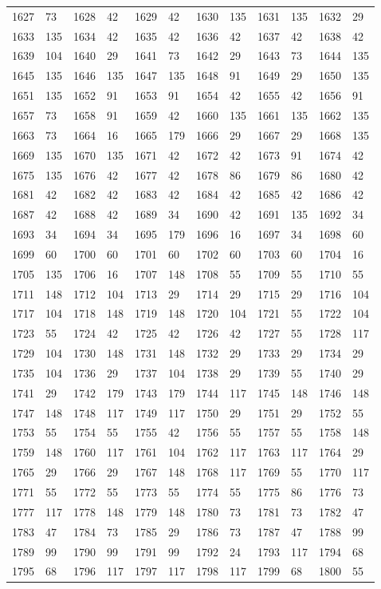 \begin{longtable}{llllllllllll}
1627 & 73&1628 &42&1629& 42&1630 &135&1631 &135&1632& 29\\
1633 & 135&1634 &42&1635& 42&1636 &42&1637 &42&1638& 42\\
1639 & 104&1640 &29&1641& 73&1642 &29&1643 &73&1644& 135\\
1645 & 135&1646 &135&1647& 135&1648 &91&1649 &29&1650& 135\\
1651 & 135&1652 &91&1653& 91&1654 &42&1655 &42&1656& 91\\
1657 & 73&1658 &91&1659& 42&1660 &135&1661 &135&1662& 135\\
1663 & 73&1664 &16&1665& 179&1666 &29&1667 &29&1668& 135\\
1669 & 135&1670 &135&1671& 42&1672 &42&1673 &91&1674& 42\\
1675 & 135&1676 &42&1677& 42&1678 &86&1679 &86&1680& 42\\
1681 & 42&1682 &42&1683& 42&1684 &42&1685 &42&1686& 42\\
1687 & 42&1688 &42&1689& 34&1690 &42&1691 &135&1692& 34\\
1693 & 34&1694 &34&1695& 179&1696 &16&1697 &34&1698& 60\\
1699 & 60&1700 &60&1701& 60&1702 &60&1703 &60&1704& 16\\
1705 & 135&1706 &16&1707& 148&1708 &55&1709 &55&1710& 55\\
1711 & 148&1712 &104&1713& 29&1714 &29&1715 &29&1716& 104\\
1717 & 104&1718 &148&1719& 148&1720 &104&1721 &55&1722& 104\\
1723 & 55&1724 &42&1725& 42&1726 &42&1727 &55&1728& 117\\
1729 & 104&1730 &148&1731& 148&1732 &29&1733 &29&1734& 29\\
1735 & 104&1736 &29&1737& 104&1738 &29&1739 &55&1740& 29\\
1741 & 29&1742 &179&1743& 179&1744 &117&1745 &148&1746& 148\\
1747 & 148&1748 &117&1749& 117&1750 &29&1751 &29&1752& 55\\
1753 & 55&1754 &55&1755& 42&1756 &55&1757 &55&1758& 148\\
1759 & 148&1760 &117&1761& 104&1762 &117&1763 &117&1764& 29\\
1765 & 29&1766 &29&1767& 148&1768 &117&1769 &55&1770& 117\\
1771 & 55&1772 &55&1773& 55&1774 &55&1775 &86&1776& 73\\
1777 & 117&1778 &148&1779& 148&1780 &73&1781 &73&1782& 47\\
1783 & 47&1784 &73&1785& 29&1786 &73&1787 &47&1788& 99\\
1789 & 99&1790 &99&1791& 99&1792 &24&1793 &117&1794& 68\\
1795 & 68&1796 &117&1797& 117&1798 &117&1799 &68&1800& 55\\
\bottomrule\end{longtable}
